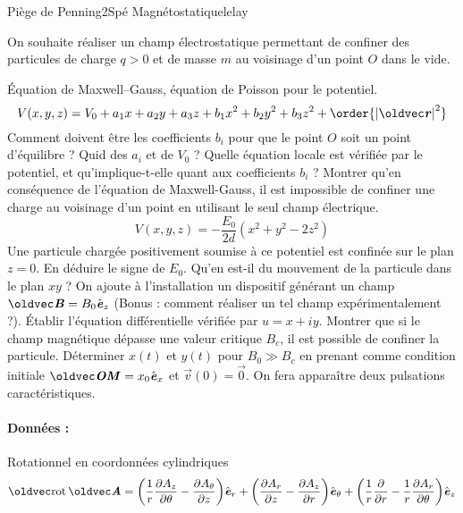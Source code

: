 \begin{exercise}{Piège de Penning}{2}{Spé}
{Magnétostatique}{lelay}

On souhaite réaliser un champ électrostatique permettant de confiner des particules de charge $q > 0$ et de masse $m$ au voisinage d'un point $O$ dans le vide.

\begin{questions}
    \questioncours Équation de Maxwell--Gauss, équation de Poisson pour le potentiel.
    $$
    V(x, y, z) = V_0 + a_1 x + a_2 y + a_3 z + b_1 x^2+ b_2y^2 + b_3z^2 + \order{\abs{\vr}^2}
    $$
    \question Comment doivent être les coefficients $b_i$ pour que le point $O$ soit un point d'équilibre ? Quid des $a_i$ et de $V_0$ ?
    \question Quelle équation locale est vérifiée par le potentiel, et qu'implique-t-elle quant aux coefficients $b_i$ ? Montrer qu'en conséquence de l'équation de Maxwell-Gauss, il est impossible de confiner une charge au voisinage d'un point en utilisant le seul champ électrique.
    $$
    V(x, y, z) = -\frac{E_0}{2d}(x^2+y^2-2z^2)
    $$
    \question Une particule chargée positivement soumise à ce potentiel est confinée sur le plan $z = 0$. En déduire le signe de $E_0$. Qu'en est-il du mouvement de la particule dans le plan $xy$ ?
    \question On ajoute à l'installation un dispositif générant un champ $\vec{B} = B_0 \ve_z$ (Bonus : comment réaliser un tel champ expérimentalement ?). Établir l'équation différentielle vérifiée par $u = x+  iy$.
    \question Montrer que si le champ magnétique dépasse une valeur critique $B_c$, il est possible de confiner la particule.
    \question Déterminer $x(t)$ et $y(t)$ pour $B_0 \gg B_c$ en prenant comme condition initiale $\vec{OM} = x_0 \ve_x$ et $\vec{v}(0) = \vec{0}$. On fera apparaître deux pulsations caractéristiques.
    
\end{questions}

\paragraph{Données :} 
Rotationnel en coordonnées cylindriques
$$\rot\vA = \qty(\dfrac{1}{r}\pdv{A_z}{\theta} - \pdv{A_\theta}{z}) \ve_r
+ \qty(\pdv{A_r}{z} - \pdv{A_z}{r}) \ve_\theta
+ \qty(\dfrac{1}{r}\pdv{}{r} (r A_\theta) - \dfrac{1}{r}\pdv{A_r}{\theta}) \ve_z$$ 

\end{exercise}

